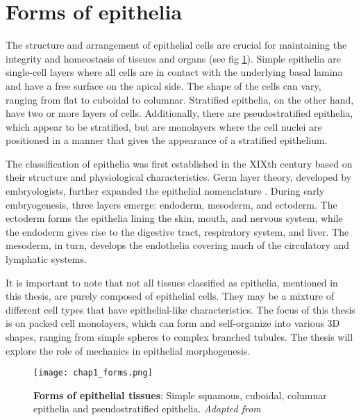 \hypertarget{forms-of-epithelia}{%
	\section{Forms of epithelia}\label{forms-of-epithelia}}

The structure and arrangement of epithelial cells are crucial for maintaining the integrity and homeostasis of tissues and organs (see fig \ref{fig_1_5}). Simple epithelia are single-cell layers where all cells are in contact with the underlying basal lamina and have a free surface on the apical side. The shape of the cells can vary, ranging from flat to cuboidal to columnar. Stratified epithelia, on the other hand, have two or more layers of cells. Additionally, there are pseudostratified epithelia, which appear to be stratified, but are monolayers where the cell nuclei are positioned in a manner that gives the appearance of a stratified epithelium.

The classification of epithelia was first established in the XIXth century based on their structure and physiological characteristics. Germ layer theory, developed by embryologists, further expanded the epithelial nomenclature \cite{maccord2012}. During early embryogenesis, three layers emerge: endoderm, mesoderm, and ectoderm. The ectoderm forms the epithelia lining the skin, mouth, and nervous system, while the endoderm gives rise to the digestive tract, respiratory system, and liver. The mesoderm, in turn, develops the endothelia covering much of the circulatory and lymphatic systems.

It is important to note that not all tissues classified as epithelia, mentioned in this thesis, are purely composed of epithelial cells. They may be a mixture of different cell types that have epithelial-like characteristics. The focus of this thesis is on packed cell monolayers, which can form and self-organize into various 3D shapes, ranging from simple spheres to complex branched tubules. The thesis will explore the role of mechanics in epithelial morphogenesis.

\begin{figure}[H]
	\centering
	\texttt{[image: chap1\_forms.png]}
	\caption{\label{fig_1_5} \textbf{Forms of epithelial tissues}: Simple squamous, cuboidal, columnar epithelia and pseudostratified epithelia. \textit{Adapted from \cite{zotero-9680}}}
\end{figure}
